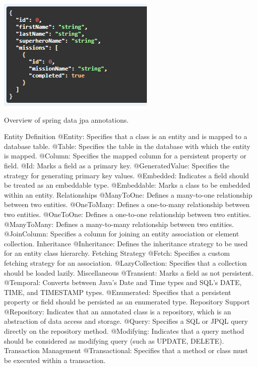\includegraphics{./images/chapter-jpa/superhero_detail_dto}


Overview of spring data jpa annotations.

Entity Definition
@Entity: Specifies that a class is an entity and is mapped to a database table.
@Table: Specifies the table in the database with which the entity is mapped.
@Column: Specifies the mapped column for a persistent property or field.
@Id: Marks a field as a primary key.
@GeneratedValue: Specifies the strategy for generating primary key values.
@Embedded: Indicates a field should be treated as an embeddable type.
@Embeddable: Marks a class to be embedded within an entity.
Relationships
@ManyToOne: Defines a many-to-one relationship between two entities.
@OneToMany: Defines a one-to-many relationship between two entities.
@OneToOne: Defines a one-to-one relationship between two entities.
@ManyToMany: Defines a many-to-many relationship between two entities.
@JoinColumn: Specifies a column for joining an entity association or element collection.
Inheritance
@Inheritance: Defines the inheritance strategy to be used for an entity class hierarchy.
Fetching Strategy
@Fetch: Specifies a custom fetching strategy for an association.
@LazyCollection: Specifies that a collection should be loaded lazily.
Miscellaneous
@Transient: Marks a field as not persistent.
@Temporal: Converts between Java's Date and Time types and SQL's DATE, TIME, and TIMESTAMP types.
@Enumerated: Specifies that a persistent property or field should be persisted as an enumerated type.
Repository Support
@Repository: Indicates that an annotated class is a repository, which is an abstraction of data access and storage.
@Query: Specifies a SQL or JPQL query directly on the repository method.
@Modifying: Indicates that a query method should be considered as modifying query (such as UPDATE, DELETE).
Transaction Management
@Transactional: Specifies that a method or class must be executed within a transaction.



